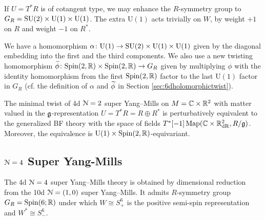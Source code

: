 \documentclass[10pt, oneside]{article}
\renewcommand{\U}{\mathrm{U}}
\begin{document}
If $U = T^* R$ is of cotangent type, we may enhance the $R$-symmetry group to $G_R=\SU(2)\times \U(1)\times \U(1)$. The extra $\U(1)$ acts trivially on $W$, by weight $+1$ on $R$ and weight $-1$ on $R^*$.

We have a homomorphism $\alpha\colon \U(1)\rightarrow  \SU(2)\times \U(1) \times \U(1)$ given by the diagonal embedding into the first and the third components. We also use a new twisting homomorphism $\widetilde{\phi}\colon \mathrm{Spin}(2, \mathbb R)\times \mathrm{Spin}(2, \mathbb R)\rightarrow G_R$ given by multiplying $\phi$ with the identity homomorphism from the first $\mathrm{Spin}(2, \mathbb R)$ factor to the last $\U(1)$ factor in $G_R$ (cf. the definition of $\alpha$ and $\widetilde{\phi}$ in Section \ref{sec:6dholomorphictwist}).

\begin{theorem}\label{thm:4d_11_twistgraded}
The minimal twist of 4d $\mathcal N=2$ super Yang--Mills on $M=\mathbb C \times \mathbb R^2$ with matter valued in the $\mathfrak g$-representation $U=T^* R=R\oplus R^*$ is perturbatively equivalent to the generalized BF theory with the space of fields $T^*[-1]\operatorname{Map}(\mathbb C \times \mathbb R^2_{\mathrm{dR}}, R/\mathfrak g)$. Moreover, the equivalence is $\U(1)\times \Spin(2, \RR)$-equivariant.
\end{theorem}

\subsection{\texorpdfstring{$\mathcal N=4$}{N=4} Super Yang-Mills} \label{4d_4_section}

The 4d $\mathcal N=4$ super Yang--Mills theory is obtained by dimensional reduction from the 10d $\mathcal N=(1, 0)$ super Yang--Mills. 
It admits $R$-symmetry group $G_R=\mathrm{Spin}(6; \mathbb R)$ under which $W \cong S_+^6$ is the positive semi-spin representation and $W^* \cong S_-^6$. 
\end{document}
